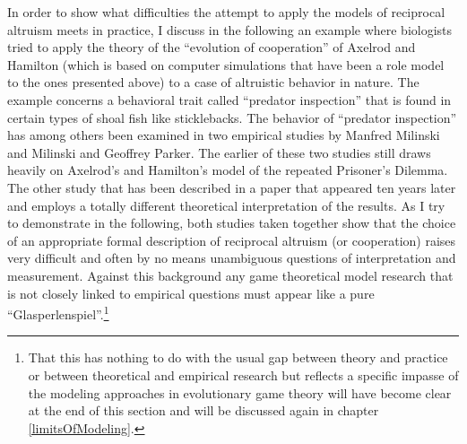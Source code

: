In order to show what difficulties the attempt to apply the models of
reciprocal altruism meets in practice, I discuss in the following an
example where biologists tried to apply the theory of the ``evolution of
cooperation'' of Axelrod and Hamilton \cite[]{axelrod:1984} (which is based on
computer simulations that have been a role model to the ones presented above)
to a case of altruistic behavior in nature. The example concerns a
behavioral trait called ``predator inspection'' that is found in certain
types of shoal fish like sticklebacks.  The behavior of ``predator
inspection'' has among others been examined in two empirical studies by
Manfred Milinski and Milinski and Geoffrey Parker. The earlier of these two
studies \cite[]{milinski:1987} still draws heavily on Axelrod's and Hamilton's
model of the repeated Prisoner's Dilemma. The other study that has been
described in a paper that appeared ten years later
\cite[]{milinski-parker:1997} and employs a totally different theoretical
interpretation of the results. As I try to demonstrate in the following,
both studies taken together show that the choice of an appropriate formal
description of reciprocal altruism (or cooperation) raises very difficult
and often by no means unambiguous questions of interpretation and measurement.
Against this background any game theoretical model research that is not
closely linked to empirical questions must appear like a pure
``Glasperlenspiel''.\footnote{That this has nothing to do with the usual gap
  between theory and practice or between theoretical and empirical research
  but reflects a specific impasse of the modeling approaches in evolutionary
  game theory will have become clear at the end of this section and will be
  discussed again in chapter \ref{limitsOfModeling}.}

